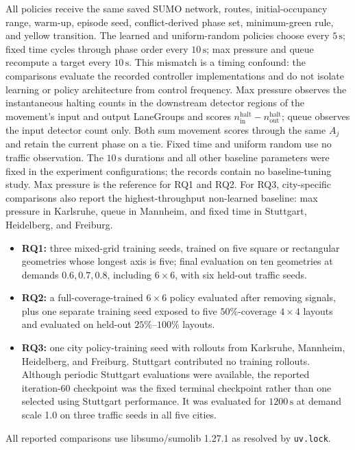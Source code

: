 \documentclass[10pt,a4paper]{article}
\begin{document}
All policies receive the same saved SUMO network, routes, initial-occupancy range, warm-up, episode seed, conflict-derived phase set, minimum-green rule, and yellow transition.
The learned and uniform-random policies choose every \(5\,\mathrm{s}\); fixed time cycles through phase order every \(10\,\mathrm{s}\); max pressure and queue recompute a target every \(10\,\mathrm{s}\).
This mismatch is a timing confound: the comparisons evaluate the recorded controller implementations and do not isolate learning or policy architecture from control frequency.
Max pressure observes the instantaneous halting counts in the downstream detector regions of the movement's input and output LaneGroups and scores \(n^{\mathrm{halt}}_{\mathrm{in}}-n^{\mathrm{halt}}_{\mathrm{out}}\); queue observes the input detector count only.
Both sum movement scores through the same \(A_j\) and retain the current phase on a tie.
Fixed time and uniform random use no traffic observation.
The \(10\,\mathrm{s}\) durations and all other baseline parameters were fixed in the experiment configurations; the records contain no baseline-tuning study.
Max pressure is the reference for RQ1 and RQ2.
For RQ3, city-specific comparisons also report the highest-throughput non-learned baseline: max pressure in Karlsruhe, queue in Mannheim, and fixed time in Stuttgart, Heidelberg, and Freiburg.

\begin{itemize}
  \item \textbf{RQ1:} three mixed-grid training seeds, trained on five square or rectangular geometries whose longest axis is five; final evaluation on ten geometries at demands \(0.6,0.7,0.8\), including \(6\times6\), with six held-out traffic seeds.
  \item \textbf{RQ2:} a full-coverage-trained \(6\times6\) policy evaluated after removing signals, plus one separate training seed exposed to five \(50\%\)-coverage \(4\times4\) layouts and evaluated on held-out \(25\%\)--\(100\%\) layouts.
  \item \textbf{RQ3:} one city policy-training seed with rollouts from Karlsruhe, Mannheim, Heidelberg, and Freiburg. Stuttgart contributed no training rollouts. Although periodic Stuttgart evaluations were available, the reported iteration-60 checkpoint was the fixed terminal checkpoint rather than one selected using Stuttgart performance. It was evaluated for \(1200\,\mathrm{s}\) at demand scale 1.0 on three traffic seeds in all five cities.
\end{itemize}
All reported comparisons use libsumo/sumolib 1.27.1 as resolved by \texttt{uv.lock}.
\end{document}
